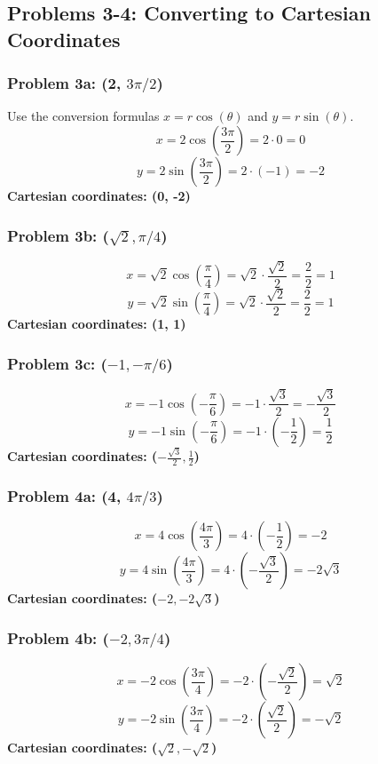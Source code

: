 \documentclass{article}
\begin{document}
\subsection*{Problems 3-4: Converting to Cartesian Coordinates}

\subsubsection*{Problem 3a: (2, \(3\pi/2\))}
Use the conversion formulas \(x = r \cos(\theta)\) and \(y = r \sin(\theta)\).
\[ x = 2 \cos\left(\frac{3\pi}{2}\right) = 2 \cdot 0 = 0 \]
\[ y = 2 \sin\left(\frac{3\pi}{2}\right) = 2 \cdot (-1) = -2 \]
\textbf{Cartesian coordinates: (0, -2)}

\subsubsection*{Problem 3b: (\(\sqrt{2}, \pi/4\))}
\[ x = \sqrt{2} \cos\left(\frac{\pi}{4}\right) = \sqrt{2} \cdot \frac{\sqrt{2}}{2} = \frac{2}{2} = 1 \]
\[ y = \sqrt{2} \sin\left(\frac{\pi}{4}\right) = \sqrt{2} \cdot \frac{\sqrt{2}}{2} = \frac{2}{2} = 1 \]
\textbf{Cartesian coordinates: (1, 1)}

\subsubsection*{Problem 3c: (\(-1, -\pi/6\))}
\[ x = -1 \cos\left(-\frac{\pi}{6}\right) = -1 \cdot \frac{\sqrt{3}}{2} = -\frac{\sqrt{3}}{2} \]
\[ y = -1 \sin\left(-\frac{\pi}{6}\right) = -1 \cdot \left(-\frac{1}{2}\right) = \frac{1}{2} \]
\textbf{Cartesian coordinates: (\(-\frac{\sqrt{3}}{2}, \frac{1}{2}\))}

\subsubsection*{Problem 4a: (4, \(4\pi/3\))}
\[ x = 4 \cos\left(\frac{4\pi}{3}\right) = 4 \cdot \left(-\frac{1}{2}\right) = -2 \]
\[ y = 4 \sin\left(\frac{4\pi}{3}\right) = 4 \cdot \left(-\frac{\sqrt{3}}{2}\right) = -2\sqrt{3} \]
\textbf{Cartesian coordinates: (\(-2, -2\sqrt{3}\))}

\subsubsection*{Problem 4b: (\(-2, 3\pi/4\))}
\[ x = -2 \cos\left(\frac{3\pi}{4}\right) = -2 \cdot \left(-\frac{\sqrt{2}}{2}\right) = \sqrt{2} \]
\[ y = -2 \sin\left(\frac{3\pi}{4}\right) = -2 \cdot \left(\frac{\sqrt{2}}{2}\right) = -\sqrt{2} \]
\textbf{Cartesian coordinates: (\(\sqrt{2}, -\sqrt{2}\))}
\end{document}
